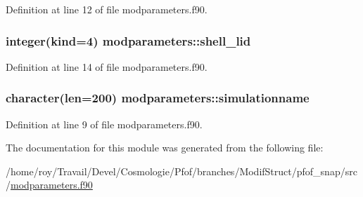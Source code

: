 Definition at line 12 of file modparameters.\-f90.

\hypertarget{classmodparameters_a669111d8b0ac2247e89f14c8778d77d5}{
\subsubsection[{shell\-\_\-lid}]{\setlength{\rightskip}{0pt plus 5cm}integer(kind=4) modparameters\-::shell\-\_\-lid}}\label{classmodparameters_a669111d8b0ac2247e89f14c8778d77d5}


Definition at line 14 of file modparameters.\-f90.

\hypertarget{classmodparameters_a8e3087ed26ddd977f3b7214948ebf62b}{
\subsubsection[{simulationname}]{\setlength{\rightskip}{0pt plus 5cm}character(len=200) modparameters\-::simulationname}}\label{classmodparameters_a8e3087ed26ddd977f3b7214948ebf62b}


Definition at line 9 of file modparameters.\-f90.



The documentation for this module was generated from the following file\-:\begin{DoxyCompactItemize}
\item 
/home/roy/\-Travail/\-Devel/\-Cosmologie/\-Pfof/branches/\-Modif\-Struct/pfof\-\_\-snap/src/\hyperlink{pfof__snap_2src_2modparameters_8f90}{modparameters.\-f90}\end{DoxyCompactItemize}
